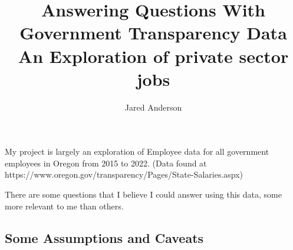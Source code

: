 \documentclass[letterpaper]{article}
\author{Jared Anderson}
\theoremstyle{definition}
\begin{document}
		
\title{
	Answering Questions With Government Transparency Data\\
	\large An Exploration of private sector jobs
}

\maketitle
    
    
My project is largely an exploration of Employee data for all government employees in
Oregon from 2015 to 2022. (Data found at
https://www.oregon.gov/transparency/Pages/State-Salaries.aspx)

There are some questions that I believe I could answer using
this data, some more relevant to me than others.

\hypertarget{some-assumptions-and-caveats}{%
\subsection{Some Assumptions and
Caveats}\label{some-assumptions-and-caveats}}
\end{document}
